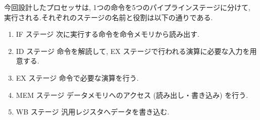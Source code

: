 \documentclass[../specifications.tex]{subfiles}
\begin{document}
  今回設計したプロセッサは, 1つの命令を5つのパイプラインステージに分けて, 
  実行される.それぞれのステージの名前と役割は以下の通りである.
  \begin{enumerate}
    \item IF ステージ
    \newline 次に実行する命令を命令メモリから読み出す.

    \item ID ステージ
    \newline 命令を解読して, EX ステージで行われる演算に必要な入力を用意する.

    \item EX ステージ
    \newline 命令で必要な演算を行う.

    \item MEM ステージ
    \newline データメモリへのアクセス (読み出し・書き込み) を行う.

    \item WB ステージ
    \newline 汎用レジスタへデータを書き込む.

  \end{enumerate}
\end{document}
